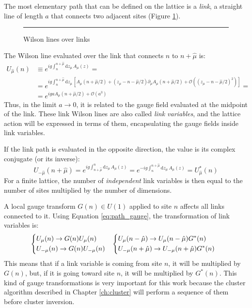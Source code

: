 The most elementary path that can be defined on the lattice is a \emph{link},
\ie a straight line of length $a$ that connects two adjacent sites (Figure \ref{fig:links}).
\begin{figure}[!htb]
    \centering
    \rule{3in}{1.5in}
    \caption{Wilson lines over links}
    \label{fig:links}
\end{figure}
The Wilson line evaluated over the link that connects $n$ to $n+\hat\mu$ is:
\begin{equation}\label{eq:link}
    \begin{aligned}
        U_{\hat\mu}(n) &\equiv e^{ig\int_n^{n+\hat\mu}\mathrm dz_\mu\,A_\mu(z)} = \\
                       &= e^{ig\int_n^{n+\hat\mu}\mathrm dz_\mu\,\left[A_\mu(n+\hat\mu/2) + (z_\mu-n-\hat\mu/2)\partial_\mu A_\mu(n+\hat\mu/2)%
                                                                                     + \mathcal O\left((z_\mu-n-\hat\mu/2)^2\right)\right]} = \\
                       &= e^{igaA_\mu(n+\hat\mu/2) + \mathcal O\left(a^3\right)}
    \end{aligned}
\end{equation}
Thus, in the limit $a \to 0$, it is related to the gauge field evaluated at the midpoint of the link.
These link Wilson lines are also called \emph{link variables}, and the lattice action will be expressed in terms of them,
encapsulating the gauge fields inside link variables.

If the link path is evaluated in the opposite direction, the value is its complex conjugate (or its inverse):
\[
    U_{-\hat\mu}(n+\hat\mu) = e^{ig\int^n_{n+\hat\mu}\mathrm dz_\mu\,A_\mu(z)} = e^{-ig\int_n^{n+\hat\mu}\mathrm dz_\mu\,A_\mu(z)} = U^*_{\hat\mu}(n)
\]
For a finite lattice, the number of \emph{independent} link variables is then equal to the number of sites multiplied by the number of dimensions.

A local gauge transform $G(n) \in U(1)$ applied to site $n$ affects all links connected to it.
Using Equation \eqref{eq:path_gauge}, the transformation of link variables is:
\begin{equation}\label{eq:site_gauge}
    \begin{aligned}
        &\begin{dcases}
        U_\mu(n) \rightarrow G(n)U_\mu(n) \\
        U_{-\mu}(n) \rightarrow G(n)U_{-\mu}(n)
        \end{dcases}%
        &%
        \begin{dcases}
        U_\mu(n-\hat\mu) \rightarrow U_\mu(n-\hat\mu)G^*(n) \\
        U_{-\mu}(n+\hat\mu) \rightarrow U_{-\mu}(n+\hat\mu)G^*(n)
        \end{dcases}&
    \end{aligned}
\end{equation}
This means that if a link variable is coming from site $n$, it will be multiplied by $G(n)$, but,
if it is going toward site $n$, it will be multiplied by $G^*(n)$.
This kind of gauge transformations is very important for this work because the cluster algorithm described in Chapter \ref{ch:cluster}
will perform a sequence of them before cluster inversion.

